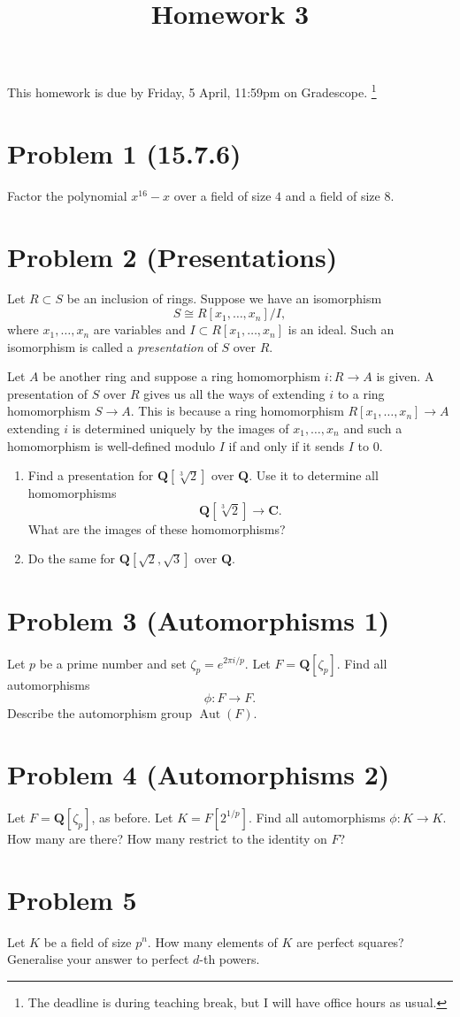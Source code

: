 \documentclass{amsart}
\date{}
\title{Homework 3}
\begin{document}
\maketitle
This homework is due by Friday, 5 April, 11:59pm on Gradescope.
\footnote{The deadline is during teaching break, but I will have office hours as usual.}
\section{Problem 1 (15.7.6)}
\label{sec:orgc506cd0}
Factor the polynomial \(x^{16}-x\) over a field of size \(4\) and a field of size \(8\).
\section{Problem 2 (Presentations)}
\label{sec:org40a0cd2}
Let \(R \subset S\) be an inclusion of rings.
Suppose we have an isomorphism
\[ S \cong R[x_1, \dots, x_n]/I, \]
where \(x_1, \dots, x_n\) are variables and \(I \subset R[x_1, \dots, x_n]\) is an ideal.
Such an isomorphism is called a \emph{presentation} of \(S\) over \(R\).

Let \(A\) be another ring and suppose a ring homomorphism \(i \colon R \to A\) is given.
A presentation of \(S\) over \(R\) gives us all the ways of extending \(i\) to a ring homomorphism \(S \to A\).
This is because a ring homomorphism \(R[x_1,\dots,x_n] \to A\) extending \(i\) is determined uniquely by the images of \(x_1, \dots, x_n\) and such a homomorphism is well-defined modulo \(I\) if and only if it sends \(I\) to \(0\).

\begin{enumerate}
\item Find a presentation for \(\mathbf{Q}[\sqrt[3]{2}]\) over \(\mathbf{Q}\).
Use it to determine all homomorphisms
\[ \mathbf{Q}[\sqrt[3] 2] \to \mathbf{C}.\]
What are the images of these homomorphisms?

\item Do the same for \(\mathbf{Q}[\sqrt 2, \sqrt 3]\) over \(\mathbf{Q}\).
\end{enumerate}
\section{Problem 3 (Automorphisms 1)}
\label{sec:org310b6bf}
Let \(p\) be a prime number and set \(\zeta_p = e^{2\pi i / p}\).
Let \(F = \mathbf{Q}[\zeta_p]\).
Find all automorphisms
\[ \phi \colon F \to F.\]
Describe the automorphism group \(\operatorname{Aut}(F)\).
\section{Problem 4 (Automorphisms 2)}
\label{sec:org445a019}

Let \(F = \mathbf{Q}[\zeta_p]\), as before.
Let \(K = F[2^{1/p}]\).
Find all automorphisms \(\phi \colon K \to K\).
How many are there?
How many restrict to the identity on \(F\)?
\section{Problem 5}
\label{sec:orgce62a6f}
Let \(K\) be a field of size \(p^n\).
How many elements of \(K\) are perfect squares?
Generalise your answer to perfect \(d\)-th powers.
\end{document}
